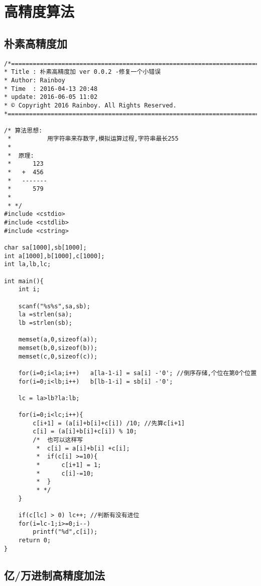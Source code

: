 \section{高精度算法}

\subsection{朴素高精度加}

\begin{lstlisting}
/*============================================================================
* Title : 朴素高精度加 ver 0.0.2 -修复一个小错误
* Author: Rainboy
* Time  : 2016-04-13 20:48
* update: 2016-06-05 11:02
* © Copyright 2016 Rainboy. All Rights Reserved.
*=============================================================================*/

/* 算法思想:
 *          用字符串来存数字,模拟运算过程,字符串最长255
 *  
 *  原理:
 *      123
 *   +  456
 *   -------
 *      579
 *
 * */
#include <cstdio>
#include <cstdlib>
#include <cstring>

char sa[1000],sb[1000];
int a[1000],b[1000],c[1000];
int la,lb,lc;

int main(){
    int i;

    scanf("%s%s",sa,sb);
    la =strlen(sa);
    lb =strlen(sb);

    memset(a,0,sizeof(a));
    memset(b,0,sizeof(b));
    memset(c,0,sizeof(c));

    for(i=0;i<la;i++)   a[la-1-i] = sa[i] -'0'; //倒序存储,个位在第0个位置
    for(i=0;i<lb;i++)   b[lb-1-i] = sb[i] -'0';

    lc = la>lb?la:lb;

    for(i=0;i<lc;i++){
        c[i+1] = (a[i]+b[i]+c[i]) /10; //先算c[i+1]
        c[i] = (a[i]+b[i]+c[i]) % 10;
        /*  也可以这样写
         *  c[i] = a[i]+b[i] +c[i];
         *  if(c[i] >=10){
         *      c[i+1] = 1;
         *      c[i]-=10;
         *  }
         * */
    }

    if(c[lc] > 0) lc++; //判断有没有进位
    for(i=lc-1;i>=0;i--)
        printf("%d",c[i]);
    return 0;
}
\end{lstlisting}


\subsection{亿/万进制高精度加法}

